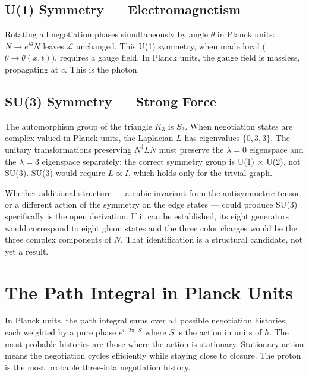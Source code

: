 \documentclass[11pt,letterpaper]{article}
\newenvironment{plainbox}{\begin{tcolorbox}[colback=blue!3!white,colframe=blue!40!white,title={\small\textit{In plain language}},breakable]}{\end{tcolorbox}}
\begin{document}
\subsection{U(1) Symmetry --- Electromagnetism}
\label{sec:orgf577ea2}

Rotating all negotiation phases simultaneously by angle \(\theta\) in Planck units:
\(N \to e^{i\theta} N\) leaves \(\mathcal{L}\) unchanged. This U(1) symmetry, when made local (\(\theta \to \theta(x,t)\)), requires a gauge field. In Planck units, the gauge field is massless, propagating at \(c\). This is the photon.

\subsection{SU(3) Symmetry --- Strong Force}
\label{sec:org5bcdb11}

The automorphism group of the triangle \(K_3\) is \(S_3\). When negotiation states are complex-valued in Planck units, the Laplacian \(L\) has eigenvalues \(\{0, 3, 3\}\). The unitary transformations preserving \(N^\dagger L N\) must preserve the \(\lambda=0\) eigenspace and the \(\lambda=3\) eigenspace separately; the correct symmetry group is U(1) × U(2), not SU(3). SU(3) would require \(L \propto I\), which holds only for the trivial graph.

Whether additional structure --- a cubic invariant from the antisymmetric tensor, or a different action of the symmetry on the edge states --- could produce SU(3) specifically is the open derivation. If it can be established, its eight generators would correspond to eight gluon states and the three color charges would be the three complex components of \(N\). That identification is a structural candidate, not yet a result.

\section{The Path Integral in Planck Units}
\label{sec:orgf42dd73}

\begin{plainbox}
In Planck units, the path integral sums over all possible negotiation histories, each weighted by a pure phase $e^{i \cdot 2\pi \cdot S}$ where $S$ is the action in units of $\hbar$. The most probable histories are those where the action is stationary. Stationary action means the negotiation cycles efficiently while staying close to closure. The proton is the most probable three-iota negotiation history.
\end{plainbox}
\end{document}
